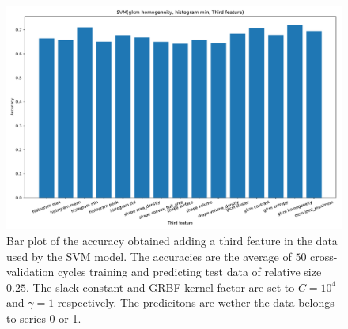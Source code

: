 \begin{figure}[H]
\centering
\includegraphics[width=1\textwidth]{Figures/third_feature4}
\caption{Bar plot of the accuracy obtained adding a third feature in the data used 
by the SVM model. The accuracies are the average 
of $50$ cross-validation cycles training and predicting test data of relative size $0.25$.
The slack constant and GRBF kernel factor are set to $C=10^4$ and $\gamma=1 $ respectively.
 The predicitons are wether the data belongs to series 0 or 1.}
\label{fig:Figures-third_feature4}
\end{figure}




